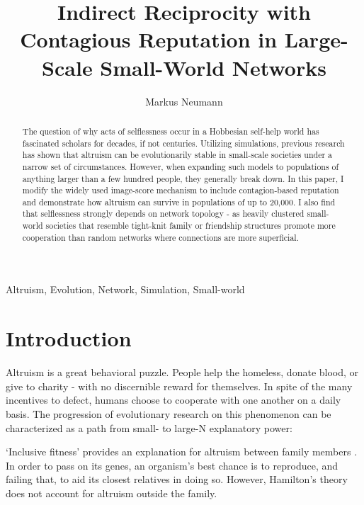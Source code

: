 \documentclass{JASSS}
\title{Indirect Reciprocity with Contagious Reputation in Large-Scale Small-World Networks}
\author[1]{Markus Neumann}
\affil[1]{Department of Political Science, The Pennsylvania State University, University Park, PA 16802, USA.}
\begin{document}
\maketitle 



\begin{abstract}
The question of why acts of selflessness occur in a Hobbesian self-help world has fascinated scholars for decades, if not centuries. Utilizing simulations, previous research has shown that altruism can be evolutionarily stable in small-scale societies under a narrow set of circumstances. However, when expanding such models to populations of anything larger than a few hundred people, they generally break down. In this paper, I modify the widely used image-score mechanism to include contagion-based reputation and demonstrate how altruism can survive in populations of up to 20,000. I also find that selflessness strongly depends on network topology - as heavily clustered small-world societies that resemble tight-knit family or friendship structures promote more cooperation than random networks where connections are more superficial.
\end{abstract}

\begin{keywords}
Altruism, Evolution, Network, Simulation, Small-world
\end{keywords}

\parano{}



\section{Introduction}
Altruism is a great behavioral puzzle. People help the homeless, donate blood, or give to charity - with no discernible reward for themselves. In spite of the many incentives to defect, humans choose to cooperate with one another on a daily basis. The progression of evolutionary research on this phenomenon can be characterized as a path from small- to large-N explanatory power:

`Inclusive fitness' provides an explanation for altruism between family members \citep{Hamilton1964}. In order to pass on its genes, an organism's best chance is to reproduce, and failing that, to aid its closest relatives in doing so. However, Hamilton's theory does not account for altruism outside the family.
\end{document}
